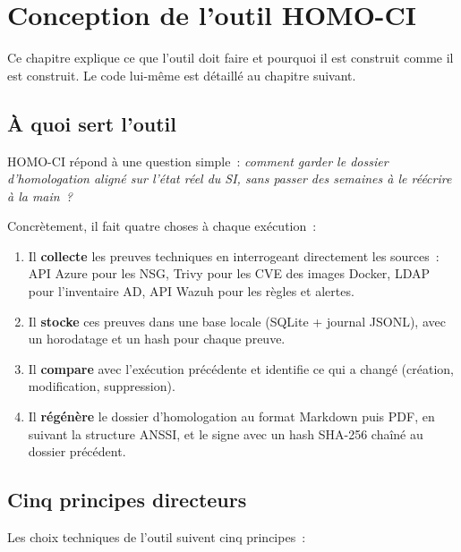 \chapter{Conception de l'outil HOMO-CI}
\label{ch:conception}

Ce chapitre explique ce que l'outil doit faire et pourquoi il est
construit comme il est construit. Le code lui-même est détaillé
au chapitre suivant.

\section{À quoi sert l'outil}

HOMO-CI répond à une question simple~: \emph{comment garder le
dossier d'homologation aligné sur l'état réel du SI, sans passer
des semaines à le réécrire à la main~?}

Concrètement, il fait quatre choses à chaque exécution~:

\begin{enumerate}
  \item Il \textbf{collecte} les preuves techniques en interrogeant
    directement les sources~: API Azure pour les NSG, Trivy pour
    les CVE des images Docker, LDAP pour l'inventaire AD, API
    Wazuh pour les règles et alertes.
  \item Il \textbf{stocke} ces preuves dans une base locale
    (SQLite + journal JSONL), avec un horodatage et un hash pour
    chaque preuve.
  \item Il \textbf{compare} avec l'exécution précédente et
    identifie ce qui a changé (création, modification,
    suppression).
  \item Il \textbf{régénère} le dossier d'homologation au format
    Markdown puis PDF, en suivant la structure ANSSI, et le signe
    avec un hash SHA-256 chaîné au dossier précédent.
\end{enumerate}

\section{Cinq principes directeurs}

Les choix techniques de l'outil suivent cinq principes~:

